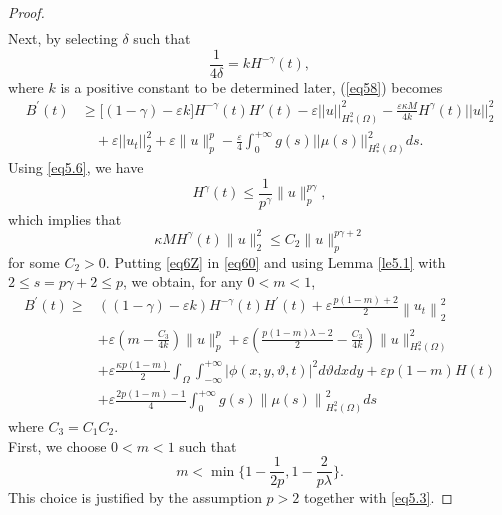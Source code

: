 \documentclass[10pt,a4paper]{amsart}
\begin{document}
\begin{proof}
\begin{equation}
\begin{split}
\end{split}
\label{eq58}
\end{equation}
Next, by selecting $\delta$ such that
\begin{equation}
    \frac{1}{4\delta} = k H^{-\gamma}(t),
    \label{eq59}
\end{equation}
where $k$ is a positive constant to be determined later, (\ref{eq58}) becomes
\begin{equation}
\begin{split}
B^{\prime}(t)
& \geq \bigr[ (1-\gamma) - \varepsilon k \bigr] H^{-\gamma}(t)H'(t) - \varepsilon ||u||^2_{H^2_{*}(\Omega)} - \frac{\varepsilon \kappa M}{4k} H^{\gamma}(t)||u||_2^2\\
&\quad + \varepsilon ||u_t||_2^2+\varepsilon\|u\|_{p}^{p} - \frac{\varepsilon}{4} \int_{0}^{+\infty} g(s) ||\mu(s)||^2_{H^2_{*}(\Omega)} ds.
\label{eq60}
\end{split}
\end{equation}
Using \eqref{eq5.6}, we have
\begin{equation*}
H^{\gamma}(t) \leq \frac{1}{p^{\gamma}}\|u\|_{p}^{p \gamma},
\end{equation*}
which implies that
\begin{equation}\label{eq6Z}
\kappa M H^{\gamma}(t)\|u\|_{2}^{2} \leq C_{2}\|u\|_{p}^{p \gamma+2}
\end{equation}
for some $C_{2}>0$. Putting \eqref{eq6Z} in \eqref{eq60} and using Lemma \ref{le5.1} with $2\leq s=p \gamma+2 \leq p$, we obtain, for any $0<m<1$,
\begin{equation}
\begin{aligned}
B^{\prime}(t) \geq & ((1-\gamma)-\varepsilon k) H^{-\gamma}(t) H^{\prime}(t)+\varepsilon\frac{p(1-m)+2}{2}\left\|u_{t}\right\|_{2}^{2} \\
& +\varepsilon\left(m-\frac{C_{3}}{4 k}\right)\|u\|_{p}^{p}+\varepsilon\left(\frac{p(1-m)\lambda -2}{2}-\frac{C_{3}}{4k}\right)\|u\|^{2}_{H^2_{*}(\Omega)} \\
& +\varepsilon\frac{\kappa p(1-m)}{2}  \int_{\Omega} \int_{-\infty}^{+\infty}|\phi(x,y,\vartheta,t)|^{2} d\vartheta dx dy+\varepsilon p(1-m)H(t)\\
& +\varepsilon\frac{2p(1-m)-1}{4}\int_{0}^{+\infty} g(s)\left\|\mu(s)\right\|^{2}_{H^2_{*}(\Omega)} ds
\end{aligned}
\end{equation}
where $C_{3}=C_1 C_{2}$. \\
First, we choose $0<m<1$ such that
$$m<\min\Big\{1-\frac{1}{2p}, 1-\frac{2}{p\lambda} \Big\}.$$
This choice is justified by the assumption $p>2$ together with \eqref{eq5.3}.


\end{proof}
\end{document}
